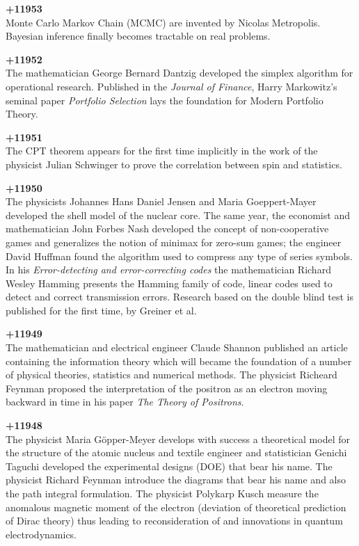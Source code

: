 \textbf{+11953}\\
Monte Carlo Markov Chain (MCMC) are invented by Nicolas Metropolis. Bayesian inference finally becomes tractable on real problems.


\textbf{+11952}\\
The mathematician George Bernard Dantzig developed the simplex algorithm for operational research. Published in the \textit{Journal of Finance}, Harry Markowitz’s seminal paper \textit{Portfolio Selection} lays the foundation for Modern Portfolio Theory.

\textbf{+11951}\\
The CPT theorem appears for the first time implicitly in the work of the physicist Julian Schwinger to prove the correlation between spin and statistics.

\textbf{+11950}\\
The physicists Johannes Hans Daniel Jensen and Maria Goeppert-Mayer developed the shell model of the nuclear core. The same year, the economist and mathematician John Forbes Nash developed the concept of non-cooperative games and generalizes the notion of minimax for zero-sum games; the engineer David Huffman found the algorithm used to compress any type of series symbols. In his \textit{Error-detecting and error-correcting codes} the mathematician Richard Wesley Hamming presents the Hamming family of code, linear codes used to detect and correct transmission errors. Research based on the double blind test is published for the first time, by Greiner et al.

\textbf{+11949}\\
The mathematician and electrical engineer Claude Shannon published an article containing the information theory which will became the foundation of a number of physical theories, statistics and numerical methods. The physicist Richeard Feynman proposed the interpretation of the positron as an electron moving backward in time in his paper \textit{The Theory of Positrons}.

\textbf{+11948}\\
The physicist Maria Göpper-Meyer develops with success a theoretical model for the structure of the atomic nucleus and textile engineer and statistician Genichi Taguchi developed the experimental designs (DOE) that bear his name. The physicist Richard Feynman introduce the diagrams that bear his name and also the path integral formulation. The physicist Polykarp Kusch measure the anomalous magnetic moment of the electron (deviation of theoretical prediction of Dirac theory) thus leading to reconsideration of and innovations in quantum electrodynamics. 

